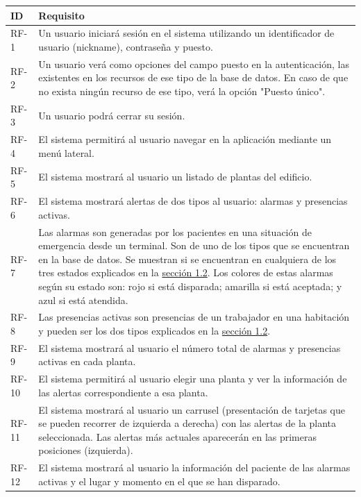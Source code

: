 \begin{longtable}{|p{1cm}|p{14cm}|}
	\hline
	\textbf{ID} & \textbf{Requisito} \\
	\hline
	RF-1 	& 	Un usuario iniciará sesión en el sistema utilizando un identificador de usuario (nickname), contraseña y puesto. \\
	\hline
	RF-2	&	Un usuario verá como opciones del campo puesto en la autenticación, las existentes en los recursos de ese tipo de la base de datos. En caso de que no exista ningún recurso de ese tipo, verá la opción "Puesto único".	\\
	\hline
	RF-3	&	Un usuario podrá cerrar su sesión.	\\
	\hline
	RF-4	&	El sistema permitirá al usuario navegar en la aplicación mediante un menú lateral. \\
	\hline
	RF-5	&	El sistema mostrará al usuario un listado de plantas del edificio. \\
	\hline
	RF-6	&	El sistema mostrará alertas de dos tipos al usuario: alarmas y presencias activas. \\
	\hline
	RF-7	&	Las alarmas son generadas por los pacientes en una situación de emergencia desde un terminal. Son de uno de los tipos que se encuentran en la base de datos. Se muestran si se encuentran en cualquiera de los tres estados explicados en la \hyperref[section-objetivos]{sección 1.2}. Los colores de estas alarmas según su estado son: rojo si está disparada; amarilla si está aceptada; y azul si está atendida. \\
	\hline
	RF-8	&	Las presencias activas son presencias de un trabajador en una habitación y pueden ser los dos tipos explicados en la \hyperref[section-objetivos]{sección 1.2}. \\
	\hline
	RF-9	&	El sistema mostrará al usuario el número total de alarmas y presencias activas en cada planta. \\
	\hline
	RF-10	&	El sistema permitirá al usuario elegir una planta y ver la información de las alertas correspondiente a esa planta. \\
	\hline
	RF-11	&	El sistema mostrará al usuario un carrusel (presentación de tarjetas que se pueden recorrer de izquierda a derecha) con las alertas de la planta seleccionada. Las alertas más actuales aparecerán en las primeras posiciones (izquierda). \\
	\hline
	RF-12	&	El sistema mostrará al usuario la información del paciente de las alarmas activas y el lugar y momento en el que se han disparado. \\

\end{longtable}

